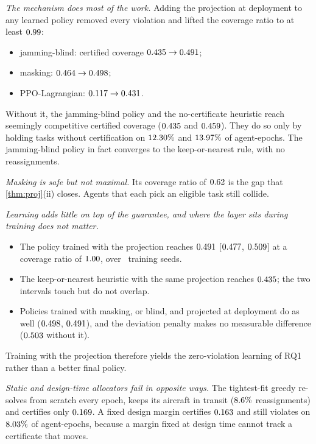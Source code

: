 \emph{The mechanism does most of the work.} Adding the projection at deployment to any
learned policy removed every violation and lifted the coverage ratio to at least
$0.99$:
\begin{itemize}[leftmargin=1.2em,itemsep=0pt,topsep=1pt]
\item jamming-blind: certified coverage $0.435\to0.491$;
\item masking: $0.464\to0.498$;
\item PPO-Lagrangian: $0.117\to0.431$.
\end{itemize}
Without it, the jamming-blind policy and the no-certificate heuristic reach seemingly
competitive certified coverage ($0.435$ and $0.459$). They do so only by holding
tasks without certification on $12.30\%$ and $13.97\%$ of
agent-epochs. The jamming-blind policy in fact converges to the keep-or-nearest rule, with no
reassignments.

\emph{Masking is safe but not maximal.} Its coverage ratio of $0.62$ is the gap that
\cref{thm:proj}(ii) closes. Agents that each pick an eligible task still collide.

\emph{Learning adds little on top of the guarantee, and where the layer sits during training
does not matter.}
\begin{itemize}[leftmargin=1.2em,itemsep=0pt,topsep=1pt]
\item The policy trained with the projection reaches $0.491$ [$0.477$,
  $0.509$] at a coverage ratio of $1.00$, over \nNSeeds\ training seeds.
\item The keep-or-nearest heuristic with the same projection reaches $0.435$; the
  two intervals touch but do not overlap.
\item Policies trained with masking, or blind, and projected at deployment do as well
  ($0.498$, $0.491$), and the deviation penalty makes no measurable
  difference ($0.503$ without it).
\end{itemize}
Training with the projection therefore yields the zero-violation learning of RQ1 rather
than a better final policy.

\emph{Static and design-time allocators fail in opposite ways.} The tightest-fit greedy
re-solves from scratch every epoch, keeps its aircraft in transit ($8.6\%$
reassignments) and certifies only $0.169$. A fixed design margin certifies $0.163$
and still violates on $8.03\%$ of agent-epochs, because a margin fixed at design
time cannot track a certificate that moves.

